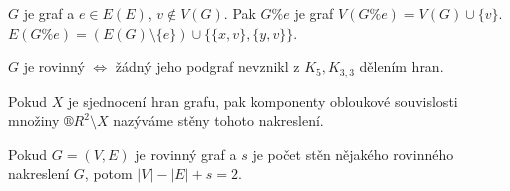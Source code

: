 \documentclass[12pt]{article}					%
\begin{document}
    \begin{definice}
        $G$ je graf a $e \in E(E)$, $v \notin V(G)$. Pak $G\%e$ je graf $V(G\%e) = V(G) \cup \{v\}$. $E(G\%e) = (E(G) \setminus \{e\}) \cup \{\{x, v\}, \{y, v\}\}$.
    \end{definice}

    \begin{veta}
        $G$ je rovinný $\Leftrightarrow$ žádný jeho podgraf nevznikl z $K_5, K_{3, 3}$ dělením hran.
    \end{veta}

    \begin{definice}[Stěny]
        Pokud $X$ je sjednocení hran grafu, pak komponenty obloukové souvislosti množiny $®R^2 \setminus X$ nazýváme stěny tohoto nakreslení.
    \end{definice}

    \begin{veta}
        Pokud $G = (V, E)$ je rovinný graf a $s$ je počet stěn nějakého rovinného nakreslení $G$, potom $|V| - |E| + s = 2$.


        \begin{dukazin}
        
        \end{dukazin}
    \end{veta}
\end{document}

